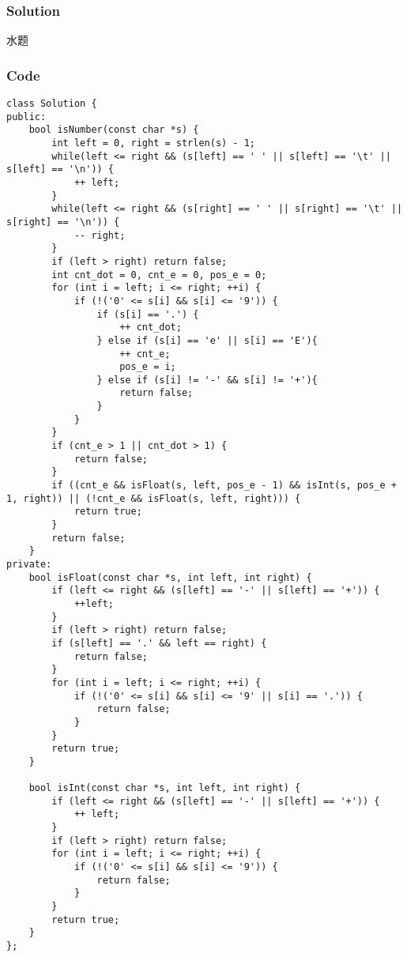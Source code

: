\documentclass[courier]{article}
\begin{document}
\begin{CJK*}{UTF8}{gkai}
\subsubsection*{Solution}
水题

\subsubsection*{Code}
\begin{lstlisting}
class Solution {
public:
    bool isNumber(const char *s) {
        int left = 0, right = strlen(s) - 1;
        while(left <= right && (s[left] == ' ' || s[left] == '\t' || s[left] == '\n')) {
            ++ left;
        }
        while(left <= right && (s[right] == ' ' || s[right] == '\t' || s[right] == '\n')) {
            -- right;
        }
        if (left > right) return false;
        int cnt_dot = 0, cnt_e = 0, pos_e = 0;
        for (int i = left; i <= right; ++i) {
            if (!('0' <= s[i] && s[i] <= '9')) {
                if (s[i] == '.') {
                    ++ cnt_dot;
                } else if (s[i] == 'e' || s[i] == 'E'){
                    ++ cnt_e;
                    pos_e = i;
                } else if (s[i] != '-' && s[i] != '+'){
                    return false;
                }
            }
        }
        if (cnt_e > 1 || cnt_dot > 1) {
            return false;
        }
        if ((cnt_e && isFloat(s, left, pos_e - 1) && isInt(s, pos_e + 1, right)) || (!cnt_e && isFloat(s, left, right))) {
            return true;
        }
        return false;
    }
private:
    bool isFloat(const char *s, int left, int right) {
        if (left <= right && (s[left] == '-' || s[left] == '+')) {
            ++left;
        }
        if (left > right) return false;
        if (s[left] == '.' && left == right) {
            return false;
        }
        for (int i = left; i <= right; ++i) {
            if (!('0' <= s[i] && s[i] <= '9' || s[i] == '.')) {
                return false;
            }
        }
        return true;
    }
    
    bool isInt(const char *s, int left, int right) {
        if (left <= right && (s[left] == '-' || s[left] == '+')) {
            ++ left;
        }
        if (left > right) return false;
        for (int i = left; i <= right; ++i) {
            if (!('0' <= s[i] && s[i] <= '9')) {
                return false;
            }
        }
        return true;
    }
};

\end{lstlisting}



\end{CJK*}
\end{document}
